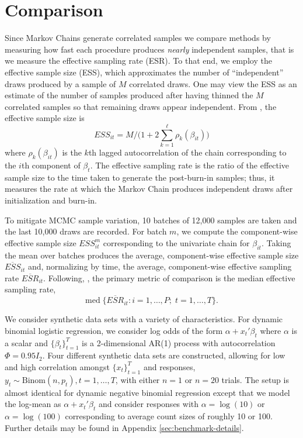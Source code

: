 \documentclass[12pt]{article}
\begin{document}
\section{Comparison}


Since Markov Chains generate correlated samples we compare methods by measuring
how fast each procedure produces \emph{nearly} independent samples, that is we
measure the effective sampling rate (ESR).  To that end, we employ the effective
sample size (ESS), which approximates the number of ``independent'' draws
produced by a sample of $M$ correlated draws.  One may view the ESS as an
estimate of the number of samples produced after having thinned the $M$
correlated samples so that remaining draws appear independent.  From
\cite{holmes-held-2006}, the effective sample size is
\[
ESS_{it} = M / \Big( 1 + 2 \sum_{k=1}^\ell \rho_k(\beta_{it}) \Big)
\]
where $\rho_k(\beta_{it})$ is the $k$th lagged autocorrelation of the chain
corresponding to the $i$th component of $\beta_t$.  The effective
sampling rate is the ratio of the effective sample size to the time taken to
generate the post-burn-in samples; thus, it measures the rate at which the
Markov Chain produces independent draws after initialization and burn-in.

To mitigate MCMC sample variation, 10 batches of 12,000 samples are taken and
the last 10,000 draws are recorded.  For batch $m$, we compute the
component-wise effective sample size $ESS_{it}^{m}$ corresponding to the
univariate chain for $\beta_{it}$.  Taking the mean over batches produces the
average, component-wise effective sample size $\overline{ESS}_{it}$ and,
normalizing by time, the average, component-wise effective sampling rate
$\overline{ESR}_{it}$.  Following, \cite{fruhwirth-schnatter-fruhwirth-2010},
the primary metric of comparison is the median effective sampling rate,
\[
\text{med} \; \Big\{ \overline{ESR}_{it} : i=1, \ldots, P; \;  t=1, \ldots, T \Big\}.
\]

We consider synthetic data sets with a variety of characteristics.
For dynamic binomial logistic regression, we consider log odds of the form
$\alpha + x_t' \beta_t$ where $\alpha$ is a scalar and $\{\beta_t\}_{t=1}^T$ is
a 2-dimensional AR(1) process with autocorrelation $\Phi = 0.95 I_2$.  Four
different synthetic data sets are constructed, allowing for low and high
correlation amongst $\{x_t\}_{t=1}^T$ and responses, $y_t \sim \text{Binom}(n,
p_t), t=1, \ldots, T$, with either $n=1$ or $n=20$ trials.  The setup is almost
identical for dynamic negative binomial regression except that we model the
log-mean as $\alpha + x_t' \beta_t$ and consider responses with $\alpha =
\log(10)$ or $\alpha = \log(100)$ corresponding to average count sizes of
roughly 10 or 100.  Further details may be found in Appendix
\ref{sec:benchmark-details}.
\end{document}
